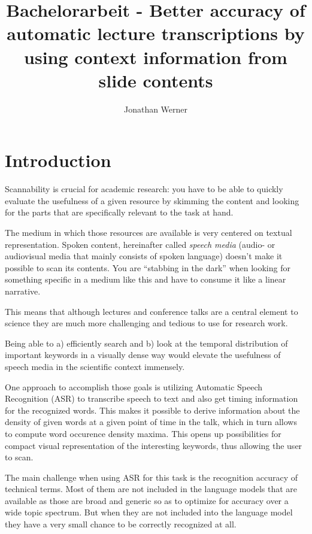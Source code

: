 \documentclass[]{article}
\title{Bachelorarbeit - Better accuracy of automatic lecture transcriptions by
using context information from slide contents}
\author{Jonathan Werner}
\date{}
\begin{document}
\maketitle

{
\hypersetup{linkcolor=black}
\setcounter{tocdepth}{3}
\tableofcontents
}
\newpage

\section*{Introduction}\label{introduction}

Scannability is crucial for academic research: you have to be able to
quickly evaluate the usefulness of a given resource by skimming the
content and looking for the parts that are specifically relevant to the
task at hand.

The medium in which those resources are available is very centered on
textual representation. Spoken content, hereinafter called \emph{speech
media} (audio- or audiovisual media that mainly consists of spoken
language) doesn't make it possible to scan its contents. You are
``stabbing in the dark'' when looking for something specific in a medium
like this and have to consume it like a linear narrative.

This means that although lectures and conference talks are a central
element to science they are much more challenging and tedious to use for
research work.

Being able to a) efficiently search and b) look at the temporal
distribution of important keywords in a visually dense way would elevate
the usefulness of speech media in the scientific context immensely.

One approach to accomplish those goals is utilizing Automatic Speech
Recognition (ASR) to transcribe speech to text and also get timing
information for the recognized words. This makes it possible to derive
information about the density of given words at a given point of time in
the talk, which in turn allows to compute word occurence density maxima.
This opens up possibilities for compact visual representation of the
interesting keywords, thus allowing the user to scan.

The main challenge when using ASR for this task is the recognition
accuracy of technical terms. Most of them are not included in the
language models that are available as those are broad and generic so as
to optimize for accuracy over a wide topic spectrum. But when they are
not included into the language model they have a very small chance to be
correctly recognized at all.
\end{document}
